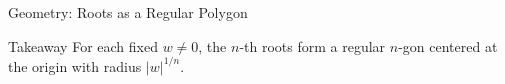 \documentclass[11pt]{beamer}
\theoremstyle{plain}
\newcommand{\Arg}{\operatorname{Arg}}
\begin{document}
\begin{frame}{Geometry: Roots as a Regular Polygon}
\begin{block}{Takeaway}
For each fixed \(w\neq 0\), the \(n\)-th roots form a regular \(n\)-gon centered at the origin with radius \(|w|^{1/n}\).
\end{block}
\end{frame}


\end{document}
